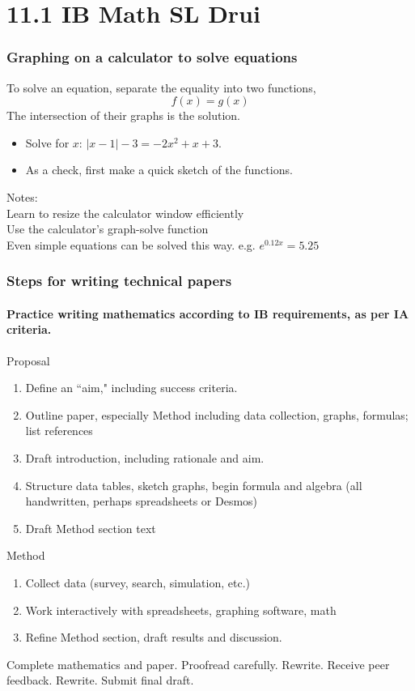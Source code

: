 \documentclass{beamer}
\begin{document}
\section{11.1 IB Math SL Drui}
\frame
{
  \frametitle{Graphing on a calculator to solve equations}

\begin{block}{To solve an equation, separate the equality into two functions, \[f(x)=g(x)\]The intersection of their graphs is the solution.}
  \begin{itemize}
      \item Solve for $x$: $|x-1|-3 = -2x^2+x+3$.
      \item As a check, first make a quick sketch of the functions.
  \end{itemize}
  \end{block}
  Notes: \\Learn to resize the calculator window efficiently\\
  Use the calculator's graph-solve function\\
  Even simple equations can be solved this way. e.g. $e^{0.12x} = 5.25$
}


\frame
{
  \frametitle{Steps for writing technical papers}
  \framesubtitle{Practice writing mathematics according to IB requirements, as per IA criteria.}
Proposal
\begin{enumerate}
    \item Define an ``aim," including success criteria. 
    \item Outline paper, especially Method including data collection, graphs, formulas; list references
    \item Draft introduction, including rationale and aim.
    \item Structure data tables, sketch graphs, begin formula and algebra (all handwritten, perhaps spreadsheets or Desmos)
    \item Draft Method section text
\end{enumerate}
Method
\begin{enumerate}
    \item Collect data (survey, search, simulation, etc.)
    \item Work interactively with spreadsheets, graphing software, math
    \item Refine Method section, draft results and discussion.
\end{enumerate}
Complete mathematics and paper. Proofread carefully. Rewrite. Receive peer feedback. Rewrite. Submit final draft.
}
\end{document}
